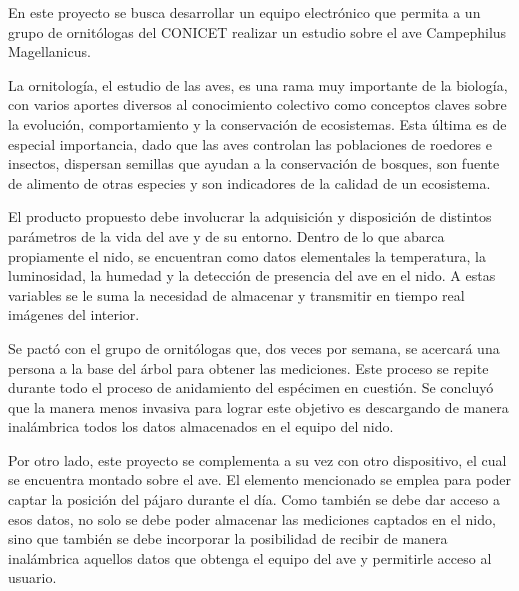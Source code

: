 En este proyecto se busca desarrollar un equipo electrónico que permita a un grupo de ornitólogas del CONICET realizar un estudio sobre el ave Campephilus Magellanicus.

La ornitología, el estudio de las aves, es una rama muy importante de la biología, con varios aportes diversos al conocimiento colectivo como conceptos claves sobre la evolución, comportamiento y la conservación de ecosistemas. Esta última es de especial importancia, dado que las aves controlan las poblaciones de roedores e insectos, dispersan semillas que ayudan a la conservación de bosques, son fuente de alimento de otras especies y son indicadores de la calidad de un ecosistema.

El producto propuesto debe involucrar la adquisición y disposición de distintos parámetros de la vida del ave y de su entorno. Dentro de lo que abarca propiamente el nido, se encuentran como datos elementales la temperatura, la luminosidad, la humedad y la detección de presencia del ave en el nido. A estas variables se le suma la necesidad de almacenar y transmitir en tiempo real imágenes del interior.

Se pactó con el grupo de ornitólogas que, dos veces por semana, se acercará una persona a la base del árbol para obtener las mediciones. Este proceso se repite durante todo el proceso de anidamiento del espécimen en cuestión. Se concluyó que la manera menos invasiva para lograr este objetivo es descargando de manera inalámbrica todos los datos almacenados en el equipo del nido. 

Por otro lado, este proyecto se complementa a su vez con otro dispositivo, el cual se encuentra montado sobre el ave. El elemento mencionado se emplea para poder captar la posición del pájaro durante el día. Como también se debe dar acceso a esos datos, no solo se debe poder almacenar las mediciones captados en el nido, sino que también se debe incorporar la posibilidad de recibir de manera inalámbrica aquellos datos que obtenga el equipo del ave y permitirle acceso al usuario. 